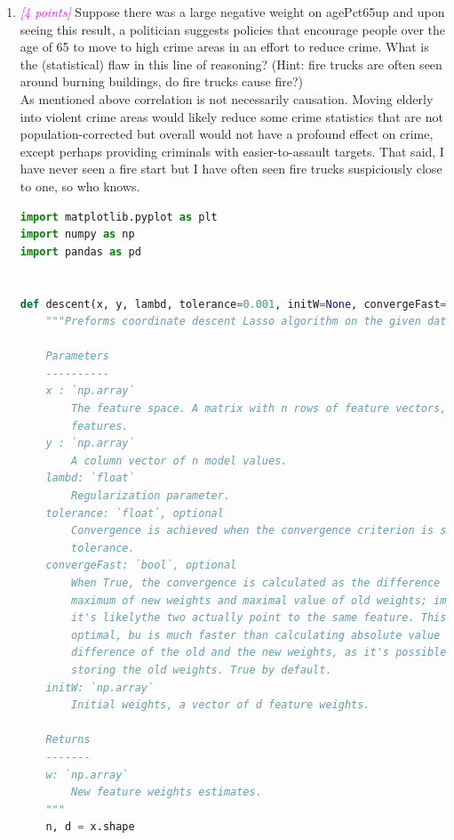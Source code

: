 \documentclass{article}
\newcommand{\1}{\mathbf{1}}
\newcommand{\points}[1]{\small\textcolor{magenta}{\emph{[#1 points]}} \normalsize}
\begin{document}
\begin{enumerate}
\begin{table}[h!]
\begin{tabular}{l|c}
        \end{tabular}{}
    \end{table}{}

    
    \item \points{4} Suppose there was a large negative weight on agePct65up and upon seeing this result, a politician suggests policies that encourage people over the age of 65 to move to high crime areas in an effort to reduce crime. What is the (statistical) flaw in this line of reasoning? (Hint:  fire trucks are often seen around burning buildings, do fire trucks cause fire?) \\
    As mentioned above correlation is not necessarily causation. Moving elderly into violent crime areas would likely reduce some crime statistics that are not population-corrected but overall would not have a profound effect on crime, except perhaps providing criminals with easier-to-assault targets. That said, I have never seen a fire start but I have often seen fire trucks suspiciously close to one, so who knows. 
    
    
\newpage
\begin{lstlisting}[language=Python]
import matplotlib.pyplot as plt
import numpy as np
import pandas as pd


def descent(x, y, lambd, tolerance=0.001, initW=None, convergeFast=True):
    """Preforms coordinate descent Lasso algorithm on the given data.

    Parameters
    ----------
    x : `np.array`
        The feature space. A matrix with n rows of feature vectors, each with d
        features.
    y : `np.array`
        A column vector of n model values.
    lambd: `float`
        Regularization parameter.
    tolerance: `float`, optional
        Convergence is achieved when the convergence criterion is smaller than
        tolerance.
    convergeFast: `bool`, optional
        When True, the convergence is calculated as the difference between
        maximum of new weights and maximal value of old weights; implying that
        it's likelythe two actually point to the same feature. This is not
        optimal, bu is much faster than calculating absolute value of minimal
        difference of the old and the new weights, as it's possible to avoid
        storing the old weights. True by default.
    initW: `np.array`
        Initial weights, a vector of d feature weights.

    Returns
    -------
    w: `np.array`
        New feature weights estimates. 
    """
    n, d = x.shape


\end{lstlisting}
\end{enumerate}
\end{document}
